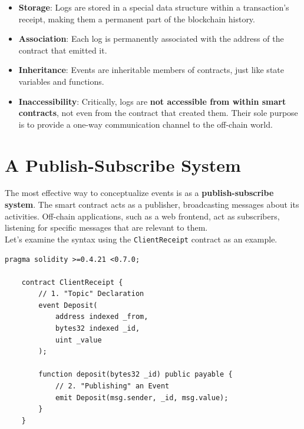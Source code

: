 \documentclass{scrbook}
\begin{document}
\begin{itemize}
    \item \textbf{Storage}: Logs are stored in a special data structure within a transaction's receipt, making them a permanent part of the blockchain history.
    
    \item \textbf{Association}: Each log is permanently associated with the address of the contract that emitted it.
    
    \item \textbf{Inheritance}: Events are inheritable members of contracts, just like state variables and functions.
    
    \item \textbf{Inaccessibility}: Critically, logs are \textbf{not accessible from within smart contracts}, not even from the contract that created them. Their sole purpose is to provide a one-way communication channel to the off-chain world.
\end{itemize}

\section{A Publish-Subscribe System}

The most effective way to conceptualize events is as a \textbf{publish-subscribe system}. The smart contract acts as a publisher, broadcasting messages about its activities. Off-chain applications, such as a web frontend, act as subscribers, listening for specific messages that are relevant to them.\\

Let's examine the syntax using the \texttt{ClientReceipt} contract as an example.

\begin{lstlisting}[caption={Client receipt}]
    pragma solidity >=0.4.21 <0.7.0;
    
    contract ClientReceipt {
        // 1. "Topic" Declaration
        event Deposit(
            address indexed _from,
            bytes32 indexed _id,
            uint _value
        );
    
        function deposit(bytes32 _id) public payable {
            // 2. "Publishing" an Event
            emit Deposit(msg.sender, _id, msg.value);
        }
    }
\end{lstlisting}
\end{document}
